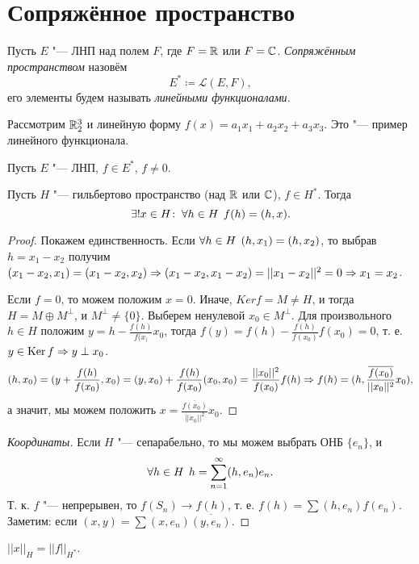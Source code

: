 \documentclass[main]{subfiles}
\begin{document}
\section{Сопряжённое пространство}

\begin{definition}
  Пусть \( E \) "--- ЛНП над полем \( F \),
  где \( F = \mathbb{R} \) или \( F = \mathbb{C} \).
  \emph{Сопряжённым пространством} назовём
  \[ E^* \coloneqq \mathcal{L}(E, F), \]
  его элементы будем называть \emph{линейными функционалами}.
\end{definition}

\begin{example}
  Рассмотрим \( \mathbb{R}_2^3 \) и линейную форму
  \( f(x) = a_1 x_1 + a_2 x_2 + a_3 x_3 \).
  Это "--- пример линейного функционала.
\end{example}

\begin{exercise}
  Пусть \( E \) "--- ЛНП, \( f \in E^* \), \( f \ne 0 \).
\end{exercise}

\begin{theorem}
  Пусть \( H \) "--- гильбертово пространство
  (над \( \mathbb{R} \) или \( \mathbb{C} \)),
  \( f \in H^* \). Тогда
  \[ \exists! x \in H \colon \: \forall {h \in H} \; \, f(h) = (h, x). \]
\end{theorem}
\begin{proof}
  Покажем единственность. Если \( \forall {h \in H} \; \,
  (h, x_1) = (h, x_2) \), то выбрав \( h = x_1 - x_2 \)
  получим \( (x_1 - x_2, x_1) = (x_1 - x_2, x_2) \Rightarrow
  (x_1 - x_2, x_1 - x_2) = ||x_1 - x_2||^2 = 0 \Rightarrow x_1 = x_2 \).

  Если \( f = 0 \), то можем положим \( x = 0 \).
  Иначе, \( Ker f = M \ne H \), и тогда
  \( H = M \oplus M^\perp \), и \( M^\perp \ne \{ 0 \} \).
  Выберем ненулевой \( x_0 \in M^\perp \). Для произвольного
  \( h \in H \) положим \( y = h - \frac{f(h)}{f(x_)} x_0 \),
  тогда \( f(y) = f(h) - \frac{f(h)}{f(x_0)} f(x_0) = 0 \),
  т. е. \( y \in \operatorname{Ker} f \Rightarrow y \perp x_0 \).
  \[ (h, x_0) = (y + \frac{f(h)}{f(x_0)}, x_0) =
    (y, x_0) + \frac{f(h)}{f(x_0)} (x_0, x_0) =
  \frac{||x_0||^2}{f(x_0)} f(h) \Rightarrow
  f(h) = (h, \frac{\overline{f(x_0)}}{||x_0||^2} x_0),
  \]
  а значит, мы можем положить \( x = \frac{\overline{f(x_0)}}{||x_0||^2} x_0 \).
\end{proof}

\begin{proof}[Координаты]
  Если \( H \) "--- сепарабельно, то мы можем выбрать ОНБ \( \{ e_n \} \),
  и \[ \forall {h \in H} \; \, h = \sum_{n = 1}^\infty (h, e_n) e_n. \]
  Т. к. \( f \) "--- непрерывен, то \( f(S_n) \to f(h) \), т. е.
  \( f(h) = \sum (h, e_n) f(e_n) \).
  Заметим: если \( (x, y) = \sum (x, e_n) \overline{(y, e_n)} \).
\end{proof}
\begin{corollary}
  \( ||x||_H = ||f||_{H^*} \).
\end{corollary}
\end{document}
